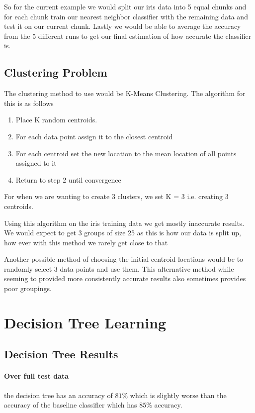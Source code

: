 \documentclass[a4paper, 12pt]{article}
\begin{document}
			So for the current example we would split our iris data into 5 equal chunks and for each chunk train our nearest neighbor classifier with the remaining data and test it on our current chunk. Lastly we would be able to average the accuracy from the 5 different runs to get our final estimation of how accurate the classifier is.	
  
  		
  		\subsection{Clustering Problem}
  			The clustering method to use would be K-Means Clustering. The algorithm for this is as follows
  			\begin{enumerate}
  				\item Place K random centroids.
  				\item For each data point assign it to the closest centroid
  				\item For each centroid set the new location to the mean location of all points assigned to it
  				\item Return to step 2 until convergence
  			\end{enumerate}
  			
  			For when we are wanting to create 3 clusters, we set K = 3 i.e. creating 3 centroids.
  			
  			Using this algorithm on the iris training data we get mostly inaccurate results. We would expect to get 3 groups of size 25 as this is how our data is split up, how ever with this method we rarely get close to that 
  			
  			Another possible method of choosing the initial centroid locations would be to randomly select 3 data points and use them. This alternative method while seeming to provided more consistently accurate results also sometimes provides poor groupings.
  			
  	\section{Decision Tree Learning}
		\subsection{Decision Tree Results}
			\paragraph{Over full test data} the decision tree has an accuracy of $81\%$ which is slightly worse than the accuracy of the baseline classifier which has $85\%$ accuracy. 
			
\end{document}
